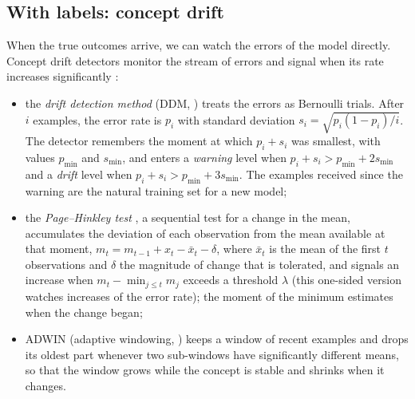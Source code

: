 \subsection{With labels: concept drift}

When the true outcomes arrive, we can watch the errors of the model directly. Concept drift detectors monitor
the stream of errors and signal when its rate increases significantly
\citep{gama2014survey,lu2019learning}:
\begin{itemize}
  \item the \emph{drift detection method} (DDM, \citealp{gama2004learning}) treats the errors as Bernoulli
        trials. After $i$ examples, the error rate is $p_i$ with standard deviation
        $s_i=\sqrt{p_i(1-p_i)/i}$. The detector remembers the moment at which $p_i+s_i$ was smallest, with
        values $p_{\min}$ and $s_{\min}$, and enters a \emph{warning} level when $p_i+s_i>p_{\min}+2s_{\min}$
        and a \emph{drift} level when $p_i+s_i>p_{\min}+3s_{\min}$. The examples received since the warning
        are the natural training set for a new model;
  \item the \emph{Page--Hinkley test} \citep{page1954continuous}, a sequential test for a change in the mean,
        accumulates the deviation of each observation from the mean available at that moment,
        $m_t=m_{t-1}+x_t-\bar x_t-\delta$, where $\bar x_t$ is the mean of the first $t$ observations and
        $\delta$ the magnitude of change that is tolerated, and signals an increase when $m_t-\min_{j\leq t}m_j$
        exceeds a threshold $\lambda$ (this one-sided version watches increases of the error rate); the moment of the minimum
        estimates when the change began;
  \item ADWIN (adaptive windowing, \citealp{bifet2007learning}) keeps a window of recent examples and drops its
        oldest part whenever two sub-windows have significantly different means, so that the window grows
        while the concept is stable and shrinks when it changes.
\end{itemize}

